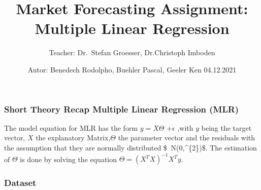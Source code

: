 \documentclass[
]{article}
\title{Market Forecasting Assignment: Multiple Linear Regression}
\author{Teacher: Dr.~Stefan Groesser, Dr.Christoph Imboden}
\date{Autor: Benedech Rodolpho, Buehler Pascal, Geeler Ken 04.12.2021}
\begin{document}
\maketitle

\hypertarget{short-theory-recap-multiple-linear-regression-mlr}{%
\subsubsection{Short Theory Recap Multiple Linear Regression
(MLR)}\label{short-theory-recap-multiple-linear-regression-mlr}}

The model equation for MLR has the form \(y=X\Theta\) +\(\epsilon\)
,with \(y\) being the target vector, \(X\) the explanatory
Matrix,\(\Theta\) the parameter vector and the residuals with the
assumption that they are normally distributed \$\epsilon \(~\)
N(0,\sigma\^{}\{2\})\$. The estimation of \(\Theta\) is done by solving
the equation \(\Theta=(X^{T}X)^{-1}X^{T}y\).

\hypertarget{dataset}{%
\subsubsection{Dataset}\label{dataset}}
\end{document}

